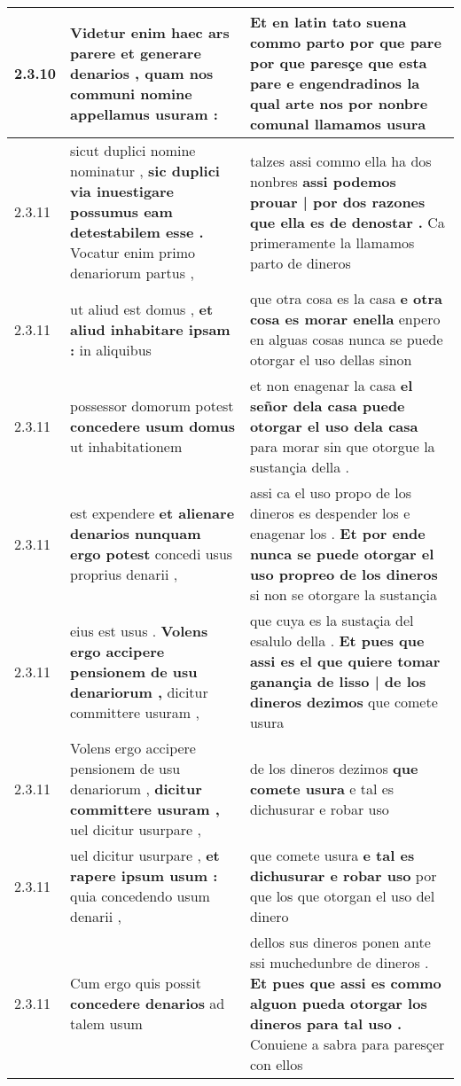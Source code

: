 \begin{tabular}{|p{1cm}|p{6.5cm}|p{6.5cm}|}
2.3.10 & Videtur enim haec ars parere \textbf{ et generare denarios , } quam nos communi nomine appellamus usuram : & Et en latin tato suena commo parto \textbf{ por que pare por que paresçe que esta pare e engendradinos la qual arte nos } por nonbre comunal llamamos usura \\\hline
2.3.11 & sicut duplici nomine nominatur , \textbf{ sic duplici via inuestigare possumus eam detestabilem esse . } Vocatur enim primo denariorum partus , & talzes assi commo ella ha dos nonbres \textbf{ assi podemos prouar | por dos razones que ella es de denostar . } Ca primeramente la llamamos parto de dineros \\\hline
2.3.11 & ut aliud est domus , \textbf{ et aliud inhabitare ipsam : } in aliquibus & que otra cosa es la casa \textbf{ e otra cosa es morar enella } enpero en alguas cosas nunca se puede otorgar el uso dellas sinon \\\hline
2.3.11 & possessor domorum potest \textbf{ concedere usum domus } ut inhabitationem & et non enagenar la casa \textbf{ el señor dela casa puede otorgar el uso dela casa } para morar sin que otorgue la sustançia della . \\\hline
2.3.11 & est expendere \textbf{ et alienare denarios nunquam ergo potest } concedi usus proprius denarii , & assi ca el uso propo de los dineros es despender los e enagenar los . \textbf{ Et por ende nunca se puede otorgar el uso propreo de los dineros } si non se otorgare la sustançia \\\hline
2.3.11 & eius est usus . \textbf{ Volens ergo accipere pensionem de usu denariorum , } dicitur committere usuram , & que cuya es la sustaçia del esalulo della . \textbf{ Et pues que assi es el que quiere tomar ganançia de lisso | de los dineros dezimos } que comete usura \\\hline
2.3.11 & Volens ergo accipere pensionem de usu denariorum , \textbf{ dicitur committere usuram , } uel dicitur usurpare , & de los dineros dezimos \textbf{ que comete usura } e tal es dichusurar e robar uso \\\hline
2.3.11 & uel dicitur usurpare , \textbf{ et rapere ipsum usum : } quia concedendo usum denarii , & que comete usura \textbf{ e tal es dichusurar e robar uso } por que los que otorgan el uso del dinero \\\hline
2.3.11 & Cum ergo quis possit \textbf{ concedere denarios } ad talem usum & dellos sus dineros ponen ante ssi muchedunbre de dineros . \textbf{ Et pues que assi es commo alguon pueda otorgar los dineros para tal uso . } Conuiene a sabra para paresçer con ellos \\\hline

\end{tabular}
